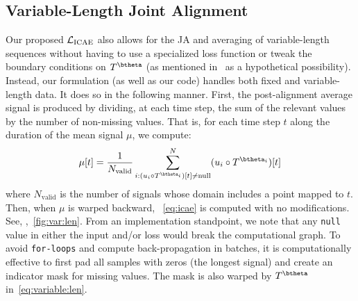 \subsection{Variable-Length Joint Alignment}\label{Subsec:Method:Variable:Length}
Our proposed $\mathcal{L}_{\mathrm{ICAE}}$ also allows for the JA and averaging of variable-length sequences without having to use a specialized loss function or tweak the boundary conditions on $T^\btheta$ (as mentioned in~\cite{Shapira:NIPS:2019:DTAN, Martinez:ICML:2022:closed} as a hypothetical possibility). Instead, our formulation 
(as well as our code) handles both fixed and variable-length data. It does so in the following manner. First, 
the post-alignment average signal is produced by dividing, at each time step, the sum of the relevant values
by the number of non-missing values.
That is, for each time step $t$ along the duration of the mean signal $\mu$, we compute:
\begin{align}\label{eq:variable:len}
     \mu[t]=\frac{1}{N_{\mathrm{valid}}}\sum_{i:(u_i\circ T^{\btheta_i})[t]\neq \mathrm{null}}^N(u_i\circ T^{\btheta_i})[t]
\end{align}
where $N_{\mathrm{valid}}$ is the number of signals whose domain includes a point mapped to $t$. 
Then, when $ \mu$ is warped backward, ~\autoref{eq:icae} is computed with no modifications. See, \eg,~\autoref{fig:var:len}. 
From an implementation standpoint, we note that any \texttt{null} value in either the input and/or loss would break the computational graph. To avoid \texttt{for-loops} and compute back-propagation in batches, 
it is computationally effective to first pad all samples with zeros (\wrt the longest signal) and create an indicator mask for missing values. The mask is also warped by $T^\btheta$ in~\autoref{eq:variable:len}.


